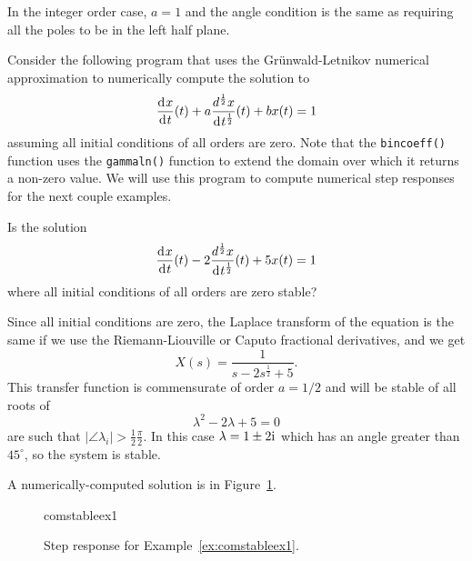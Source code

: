 \begin{remark}
  In the integer order case, $a = 1$ and the angle condition is the same as requiring all the poles to be in the left half plane.
\end{remark}

Consider the following program that uses the Gr\"unwald-Letnikov numerical approximation to numerically compute the solution to
\begin{equation*}
  \frac{\operatorname{d}\hspace*{-1pt} x}{\operatorname{d}\hspace*{-1pt} t}(t) + a \frac{d^\frac{1}{2} x}{\operatorname{d}\hspace*{-1pt} t^\frac{1}{2}}(t) + b x(t) = 1
\end{equation*}
assuming all initial conditions of all orders are zero. Note that the \texttt{bincoeff()} function uses the \texttt{gammaln()} function to extend the domain over which it returns a non-zero value. We will use this program to compute numerical step responses for the next couple examples.
\lstset{numbers=left, numberstyle=\tiny, stepnumber=1, numbersep=5pt}


\begin{example}
  Is the solution
  \begin{equation*}
  	\frac{\operatorname{d}\hspace*{-1pt} x}{\operatorname{d}\hspace*{-1pt} t}(t) -2  \frac{d^\frac{1}{2} x}{\operatorname{d}\hspace*{-1pt} t^\frac{1}{2}}(t) + 5 x(t) = 1
  \end{equation*}
  where all initial conditions of all orders are zero stable?

  Since all initial conditions are zero, the Laplace transform of the equation is the same if we use the Riemann-Liouville or Caputo fractional derivatives, and we get
  \begin{equation*}
    X(s) = \frac{1}{s - 2 s^\frac{1}{2} + 5}.
  \end{equation*}
  This transfer function is commensurate of order $a = 1/2$ and will be stable of all roots of
  \begin{equation*}
    \lambda^2 - 2 \lambda + 5 = 0
  \end{equation*}
   are such that $\left| \angle \lambda_i \right| > \frac{1}{2} \frac{\pi}{2}$.  In this case $\lambda = 1 \pm 2 \mathrm{i}\mkern1mu$ which has an angle greater than $45^\circ$, so the system is stable. 

	A numerically-computed solution is in Figure~\ref{fig:comstableex1}.
	\label{ex:comstableex1}
\end{example}

\begin{figure}
  \centering
  {comstableex1}
  \caption{Step response for Example~\ref{ex:comstableex1}.}
  \label{fig:comstableex1}
\end{figure}

